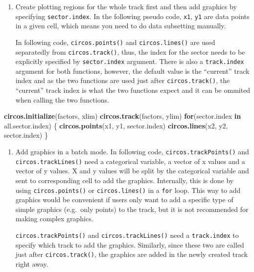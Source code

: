 \documentclass[]{book}
\newenvironment{Shaded}{\begin{snugshade}}{\end{snugshade}}
\newcommand{\KeywordTok}[1]{\textcolor[rgb]{0.13,0.29,0.53}{\textbf{#1}}}
\newcommand{\ControlFlowTok}[1]{\textcolor[rgb]{0.13,0.29,0.53}{\textbf{#1}}}
\newcommand{\NormalTok}[1]{#1}
\theoremstyle{definition}
\theoremstyle{definition}
\theoremstyle{remark}
\begin{document}
\begin{enumerate}
\def\labelenumi{\arabic{enumi}.}
\item
  Create plotting regions for the whole track first and then add
  graphics by specifying \texttt{sector.index}. In the following pseudo
  code, \texttt{x1}, \texttt{y1} are data points in a given cell, which
  means you need to do data subsetting manually.

  In following code, \texttt{circos.points()} and
  \texttt{circos.lines()} are used separatedly from
  \texttt{circos.track()}, thus, the index for the sector needs to be
  explicitly specified by \texttt{sector.index} argument. There is also
  a \texttt{track.index} argument for both functions, however, the
  default value is the ``current'' track index and as the two functions
  are used just after \texttt{circos.track()}, the ``current'' track
  index is what the two functions expect and it can be ommited when
  calling the two functions.
\end{enumerate}

\begin{Shaded}
\begin{Highlighting}[]
\KeywordTok{circos.initialize}\NormalTok{(factors, xlim)}
\KeywordTok{circos.track}\NormalTok{(factors, ylim)}
\ControlFlowTok{for}\NormalTok{(sector.index }\ControlFlowTok{in}\NormalTok{ all.sector.index) \{}
    \KeywordTok{circos.points}\NormalTok{(x1, y1, sector.index)}
    \KeywordTok{circos.lines}\NormalTok{(x2, y2, sector.index)}
\NormalTok{\}}
\end{Highlighting}
\end{Shaded}

\begin{enumerate}
\def\labelenumi{\arabic{enumi}.}
\setcounter{enumi}{1}
\item
  Add graphics in a batch mode. In following code,
  \texttt{circos.trackPoints()} and \texttt{circos.trackLines()} need a
  categorical variable, a vector of x values and a vector of y values. X
  and y values will be split by the categorical variable and sent to
  corresponding cell to add the graphics. Internally, this is done by
  using \texttt{circos.points()} or \texttt{circos.lines()} in a
  \texttt{for} loop. This way to add graphics would be convenient if
  users only want to add a specific type of simple graphics (e.g.~only
  points) to the track, but it is not recommended for making complex
  graphics.

  \texttt{circos.trackPoints()} and \texttt{circos.trackLines()} need a
  \texttt{track.index} to specify which track to add the graphics.
  Similarly, since these two are called just after
  \texttt{circos.track()}, the graphics are added in the newly created
  track right away.
\end{enumerate}
\end{document}
